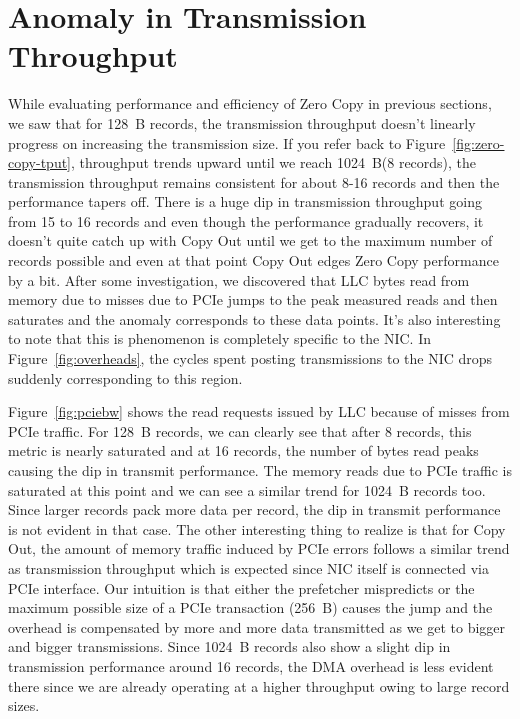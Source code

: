 \section{Anomaly in Transmission Throughput}
\label{sec:anomaly}
While evaluating performance and efficiency of Zero Copy in previous sections, we saw that for 128~B records, the transmission throughput doesn't linearly progress 
on increasing the transmission size. If you refer back to Figure~\ref{fig:zero-copy-tput}, throughput trends upward until we reach 1024~B(8 records), the transmission throughput remains consistent for about 8-16 records and 
then the performance tapers off. There is a huge dip in transmission throughput going from 15 to 16 records and even though the performance gradually recovers, it doesn't quite 
catch up with Copy Out until we get to the maximum number of records possible and even at that point Copy Out edges Zero Copy performance by a bit. After some investigation, we discovered 
that LLC bytes read from memory due to misses due to PCIe jumps to the peak measured reads and then saturates and the anomaly corresponds to these data points. It's also interesting to note 
that this is phenomenon is completely specific to the NIC. In Figure~\ref{fig:overheads}, the cycles spent posting transmissions to the NIC drops suddenly corresponding to this region.

Figure~\ref{fig:pciebw} shows the read requests issued by LLC because of misses from PCIe traffic. For 128~B records, we can clearly see that after 8 records, this metric is 
nearly saturated and at 16 records, the number of bytes read peaks causing the dip in transmit performance. The memory reads due to PCIe traffic is saturated at this point and 
we can see a similar trend for 1024~B records too. Since larger records pack more data per record, the dip in transmit performance is not evident in that case. The other interesting 
thing to realize is that for Copy Out, the amount of memory traffic induced by PCIe errors follows a similar trend as transmission throughput which is expected since 
NIC itself is connected via PCIe interface. Our intuition is that either the prefetcher mispredicts or the maximum possible size of a PCIe transaction (256~B) causes the jump 
and the overhead is compensated by more and more data transmitted as we get to bigger and bigger transmissions. Since 1024~B records also show a slight dip in transmission performance 
around 16 records, the DMA overhead is less evident there since we are already operating at a higher throughput owing to large record sizes.


